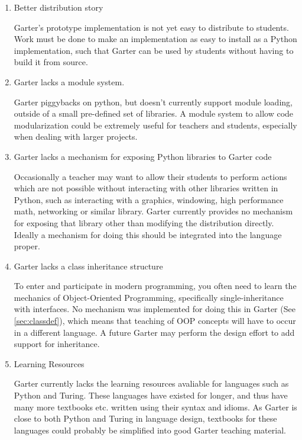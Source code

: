 \begin{enumerate}
\item Better distribution story

Garter's prototype implementation is not yet easy to distribute to students.
Work must be done to make an implementation as easy to install as a Python
implementation, such that Garter can be used by students without having to
build it from source.

\item Garter lacks a module system.

Garter piggybacks on python, but doesn't currently support module loading,
outside of a small pre-defined set of libraries. A module system to allow
code modularization could be extremely useful for teachers and students,
especially when dealing with larger projects.

\item Garter lacks a mechanism for exposing Python libraries to Garter code

Occasionally a teacher may want to allow their students to perform actions which
are not possible without interacting with other libraries written in Python,
such as interacting with a graphics, windowing, high performance math,
networking or similar library. Garter currently provides no mechanism for
exposing that library other than modifying the distribution directly. Ideally a
mechanism for doing this should be integrated into the language proper.

\item Garter lacks a class inheritance structure

To enter and participate in modern programming, you often need to learn the
mechanics of Object-Oriented Programming, specifically single-inheritance with
interfaces. No mechanism was implemented for doing this in Garter
(See \ref{sec:classdef}), which means that teaching of OOP concepts will have to
occur in a different language. A future Garter may perform the design effort to
add support for inheritance.

\item Learning Resources

Garter currently lacks the learning resources avaliable for languages such as
Python and Turing. These languages have existed for longer, and thus have many
more textbooks etc. written using their syntax and idioms. As Garter is close to
both Python and Turing in language design, textbooks for these languages could
probably be simplified into good Garter teaching material.

\end{enumerate}


